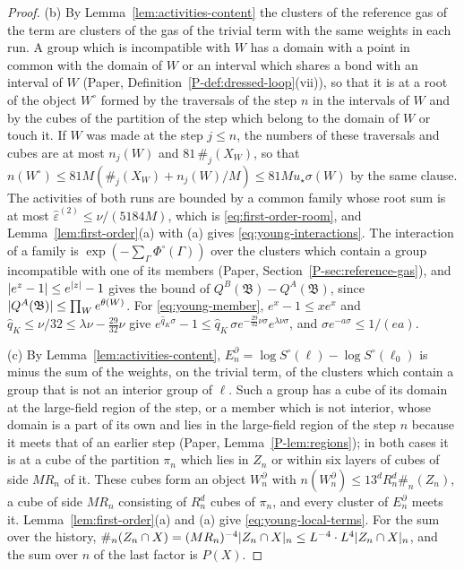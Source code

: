 \documentclass[11pt]{preprint}
\DeclarePairedDelimiter{\abs}{\lvert}{\rvert}
\numberwithin{equation}{section}
\theoremstyle{definition}
\theoremstyle{remark}
\theoremstyle{plain}
\begin{document}
\begin{proof}
(b) By Lemma~\ref{lem:activities-content} the clusters of the reference gas of the term are clusters of the gas of the trivial term with the same weights in each run. A group which is incompatible with $W$ has a domain with a point in common with the domain of $W$ or an interval which shares a bond with an interval of $W$ (Paper, Definition~\ref{P-def:dressed-loop}(vii)), so that it is at a root of the object $W^\circ$ formed by the traversals of the step $n$ in the intervals of $W$ and by the cubes of the partition of the step which belong to the domain of $W$ or touch it. If $W$ was made at the step $j \leq n$, the numbers of these traversals and cubes are at most $n_j(W)$ and $81\,\#_j(X_W)$, so that $n(W^\circ) \leq 81M(\#_j(X_W) + n_j(W)/M) \leq 81Mu_\star\sigma(W)$ by the same clause. The activities of both runs are bounded by a common family whose root sum is at most $\hat\varepsilon^{(2)} \leq \nu/(5184M)$, which is \eqref{eq:first-order-room}, and Lemma~\ref{lem:first-order}(a) with (a) gives \eqref{eq:young-interactions}. The interaction of a family is $\exp(-\sum_\Gamma\Phi^\circ(\Gamma))$ over the clusters which contain a group incompatible with one of its members (Paper, Section~\ref{P-sec:reference-gas}), and $\abs{e^z - 1} \leq e^{\abs z} - 1$ gives the bound of $Q^B(\mathfrak B) - Q^A(\mathfrak B)$, since $\abs{Q^A(\mathfrak B)} \leq \prod_We^{\theta(W)}$. For \eqref{eq:young-member}, $e^x - 1 \leq xe^x$ and $\hat q_K \leq \nu/32 \leq \lambda\nu - \frac{29}{32}\nu$ give $e^{\hat q_K\sigma} - 1 \leq \hat q_K\,\sigma e^{-\frac{29}{32}\nu\sigma}e^{\lambda\nu\sigma}$, and $\sigma e^{-a\sigma} \leq 1/(ea)$.

(c) By Lemma~\ref{lem:activities-content}, $E^\partial_n = \log S^\circ(\ell) - \log S^\circ(\ell_0)$ is minus the sum of the weights, on the trivial term, of the clusters which contain a group that is not an interior group of $\ell$. Such a group has a cube of its domain at the large-field region of the step, or a member which is not interior, whose domain is a part of its own and lies in the large-field region of the step $n$ because it meets that of an earlier step (Paper, Lemma~\ref{P-lem:regions}); in both cases it is at a cube of the partition $\pi_n$ which lies in $Z_n$ or within six layers of cubes of side $MR_n$ of it. These cubes form an object $W^\partial_n$ with $n(W^\partial_n) \leq 13^dR_n^d\#_n(Z_n)$, a cube of side $MR_n$ consisting of $R_n^d$ cubes of $\pi_n$, and every cluster of $E^\partial_n$ meets it. Lemma~\ref{lem:first-order}(a) and (a) give \eqref{eq:young-local-terms}. For the sum over the history, $\#_n(Z_n \cap X) = (MR_n)^{-4}\abs{Z_n \cap X}_n \leq L^{-4} \cdot L^4\abs{Z_n \cap X}_n$, and the sum over $n$ of the last factor is $P(X)$.


\end{proof}
\end{document}
